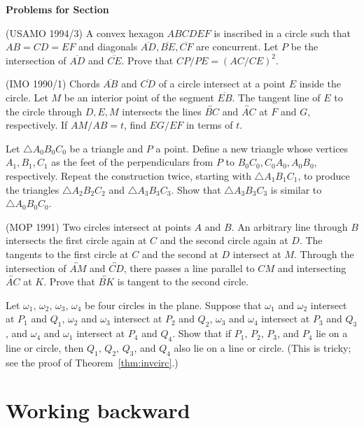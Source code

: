 \documentclass[12pt]{book}
\newcounter{exc}
\numberwithin{exc}{section}
\numberwithin{figure}{section}
\newenvironment{exer}{\vspace{0.1in}
\noindent \textbf{Problems for Section~\thesection} \vspace{0.1in}
\begin{list}{\arabic{exc}.}{\usecounter{exc}}}{\end{list}}
\numberwithin{equation}{theorem}
\def\ii{\item}
\def\line#1{\overleftrightarrow{#1}}
\def\seg#1{\overline{#1}}
\begin{document}
\begin{exer}
\ii
(USAMO 1994/3)
A convex hexagon $ABCDEF$ is inscribed in a circle such that 
$AB=CD=EF$ and diagonals $\seg{AD},\seg{BE},\seg{CF}$ are 
concurrent. Let $P$ be the 
intersection of $\seg{AD}$ and $\seg{CE}$. Prove that $CP/PE = (AC/CE)^{2}$.
\ii
(IMO 1990/1)
Chords $\seg{AB}$ and $\seg{CD}$ of a circle intersect at a point $E$ inside the 
circle. Let $M$ be an interior point of the segment $\seg{EB}$. The tangent 
line of $E$ to the circle through $D,E,M$ intersects the lines $\line{BC}$ 
and $\line{AC}$ at $F$ and $G$, respectively. If $AM/AB = t$, find $EG/EF$ 
in terms of $t$.
\ii
Let $\triangle A_{0}B_{0}C_{0}$ be a triangle and $P$ a point. Define a new 
triangle whose vertices $A_{1}, 
B_{1}, C_{1}$ as the feet of the perpendiculars from $P$ to 
$B_{0}C_{0}, C_{0}A_{0}, A_{0}B_{0}$, respectively. Repeat the construction
twice, starting with $\triangle A_1B_1C_1$, to produce
the triangles $\triangle A_{2}B_{2}C_{2}$ and $\triangle A_{3}B_{3}C_{3}$. 
Show that 
$\triangle A_{3}B_{3}C_{3}$ is similar to $\triangle A_{0}B_{0}C_{0}$.
\ii (MOP 1991) %
Two circles intersect at points $A$ and $B$. An arbitrary line 
through $B$ intersects the first circle again at $C$ and the second circle again
at $D$. The tangents to the first circle at $C$ and the second at $D$ intersect 
at $M$. Through the intersection of $\line{AM}$ and $\line{CD}$, 
there passes a line parallel
to $CM$ and intersecting $\line{AC}$ at $K$. Prove that $\line{BK}$ 
is tangent to the second circle.
\ii \label{ex:invcirc}
Let $\omega_1,\,\omega_2,\,\omega_3,\,\omega_4$ be four circles in the plane. 
Suppose that $\omega_1$ and $\omega_2$ intersect at $P_1$ and $Q_1$, 
$\omega_2$ and $\omega_3$ intersect at $P_2$ and $Q_2$,  
$\omega_3$ and $\omega_4$ intersect at $P_3$ and $Q_3$,
and $\omega_4$ and $\omega_1$ intersect at $P_4$ and $Q_4$.  Show that if
$P_1,\,P_2,\,P_3$, and $P_4$ lie on a line or circle, then
$Q_1,\,Q_2,\,Q_3$, and $Q_4$ also lie on a line or circle.
(This is tricky; see the proof of Theorem~\ref{thm:invcirc}.)
\end{exer}

\section{Working backward}
\end{document}

